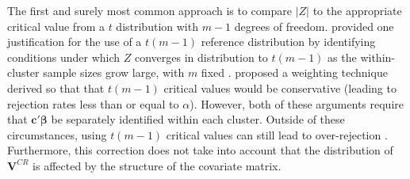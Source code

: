 \documentclass[12pt]{article}\usepackage[]{graphicx}\usepackage[]{color}
\newcommand{\bm}{\mathbf}
\newcommand{\bs}{\boldsymbol}
\begin{document}
The first and surely most common approach is to compare $|Z|$ to the appropriate critical value from a $t$ distribution with $m - 1$ degrees of freedom. 
\citet{Hansen2007asymptotic} provided one justification for the use of a $t(m-1)$ reference distribution by identifying conditions under which $Z$ converges in distribution to $t(m-1)$ as the within-cluster sample sizes grow large, with $m$ fixed \citep[see also][]{Donald2007inference}. 
\citet{Ibragimov2010tstatistic} proposed a weighting technique derived so that that $t(m-1)$ critical values would be conservative (leading to rejection rates less than or equal to $\alpha$).
However, both of these arguments require that $\bm{c}'\bs\beta$ be separately identified within each cluster. 
Outside of these circumstances, using $t(m-1)$ critical values can still lead to over-rejection \citep{Cameron2015practitioners}. 
Furthermore, this correction does not take into account that the distribution of $\bm{V}^{CR}$ is affected by the structure of the covariate matrix. 
\end{document}
